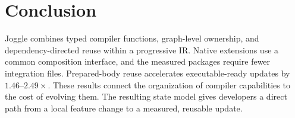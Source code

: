 \section{Conclusion}
\label{sec:conclusion}

Joggle combines typed compiler functions, graph-level ownership, and
dependency-directed reuse within a progressive IR. Native extensions use a
common composition interface, and the measured packages require fewer
integration files. Prepared-body reuse accelerates executable-ready updates
by $1.46$--$2.49\times$. These results connect the organization of compiler
capabilities to the cost of evolving them. The resulting state model gives
developers a direct path from a local feature change to a measured, reusable
update.
